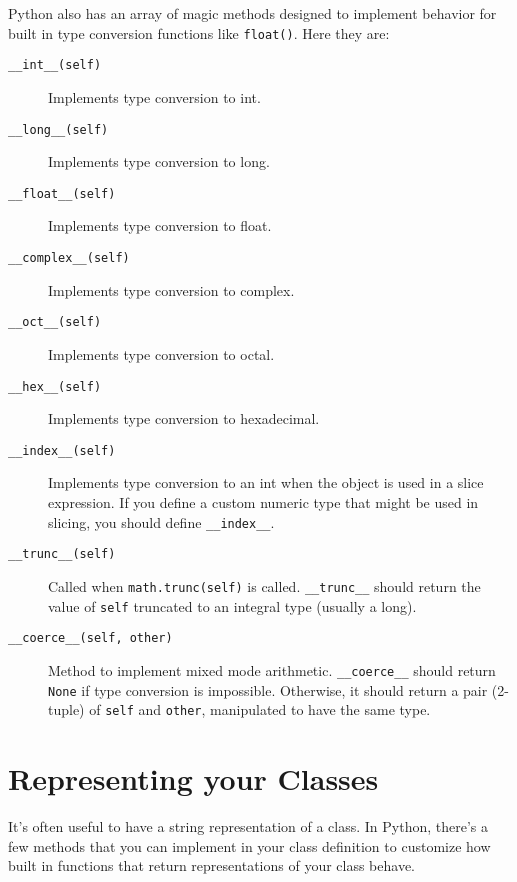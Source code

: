 \documentclass[a4paper,11pt]{article}
\newcommand{\code}[1]{\texttt{#1}}
\begin{document}
Python also has an array of magic methods designed to implement behavior for built in type conversion functions like \code{float()}. Here they are:

\begin{description}

\item[\code{__int__(self)}]
Implements type conversion to int.
\item[\code{__long__(self)}]
Implements type conversion to long.
\item[\code{__float__(self)}]
Implements type conversion to float.
\item[\code{__complex__(self)}]
Implements type conversion to complex.
\item[\code{__oct__(self)}]
Implements type conversion to octal.
\item[\code{__hex__(self)}]
Implements type conversion to hexadecimal.
\item[\code{__index__(self)}]
Implements type conversion to an int when the object is used in a slice expression. If you define a custom numeric type that might be used in slicing, you should define \code{__index__}.
\item[\code{__trunc__(self)}]
Called when \code{math.trunc(self)} is called. \code{__trunc__} should return the value of \code{self} truncated to an integral type (usually a long).
\item[\code{__coerce__(self, other)}]
Method to implement mixed mode arithmetic. \code{__coerce__} should return \code{None} if type conversion is impossible. Otherwise, it should return a pair (2-tuple) of \code{self} and \code{other}, manipulated to have the same type.

\end{description}

\section{Representing your Classes}

It's often useful to have a string representation of a class. In Python, there's a few methods that you can implement in your class definition to customize how built in functions that return representations of your class behave.
\end{document}
